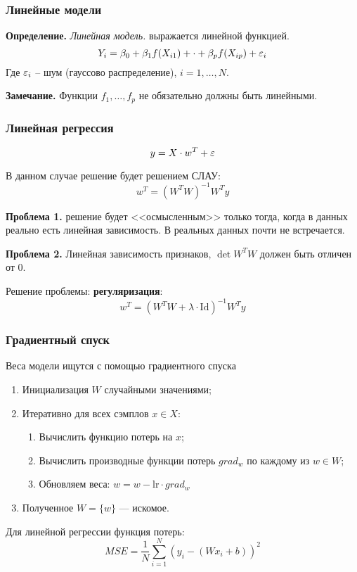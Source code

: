 \documentclass[a4paper,14pt]{article}
\begin{document}
    \subsubsection{Линейные модели}

    {\bf Определение.} { \it Линейная модель.} выражается линейной функцией.
    \[
        Y_i = \beta_0 + \beta_1 f(X_{i1}) + \cdot + \beta_p f(X_{ip}) + \varepsilon_i
    \]
    Где $\varepsilon_i$ -- шум (гауссово распределение), $i = 1,\dots, N$.

    {\bf Замечание.} Функции $f_1, \dots, f_p$ не обязательно должны быть линейными.

    \subsubsection{Линейная регрессия}

    \[
        y = X \cdot w^{T} + \varepsilon
    \]

    В данном случае решение будет решением СЛАУ:
    \[
        w^T = \left(W^{T}W\right)^{-1}W^T y
    \]

    {\bf Проблема 1.} решение будет <<осмысленным>> только тогда, когда в данных реально есть линейная зависимость. В реальных данных почти не встречается.

    {\bf Проблема 2.} Линейная зависимость признаков, $\det W^TW$ должен быть отличен от $0$.

    Решение проблемы: {\bf регуляризация}:
    \[
        w^T = \left(W^{T}W + \lambda \cdot \mathrm{Id} \right)^{-1}W^T y
    \]

    \subsubsection{Градиентный спуск}

    Веса модели ищутся с помощью градиентного спуска
    \begin{enumerate}
        \item Инициализация $W$ случайными значениями;
        \item Итеративно для всех сэмплов $x \in X$:
        \begin{enumerate}
            \item Вычислить функцию потерь на $x$;
            \item Вычислить производные функции потерь $grad_w$ по каждому из $w \in W$;
            \item Обновляем веса: $w = w - \mathrm{lr} \cdot grad_w$
        \end{enumerate}
        \item Полученное $W = \{w\}$ --- искомое.
    \end{enumerate}

    Для линейной регрессии функция потерь:
    \[
        MSE = \frac{1}{N} \sum\limits_{i=1}^N \left( y_i - (W x_i + b)\right) ^ 2
    \]
\end{document}
